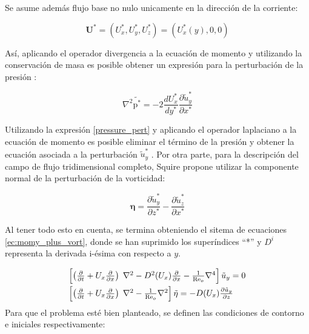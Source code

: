 Se asume además flujo base no nulo unicamente en la dirección de la corriente: 

\begin{equation*}
\mathbf{U^*} = (U^*_x, U^*_y, U^*_z) = (U^*_x(y),0,0)
\end{equation*}

Así, aplicando el operador divergencia a la ecuación de momento y utilizando la conservación de masa es posible obtener un expresión para la perturbación de la presión \cite{schmid}:

\begin{equation}
\nabla^2 \tilde{\text{p}^*} = -2 \frac{d U^*_x}{d y^*} \frac{\partial \tilde{u}^*_y}{\partial x^*} 
\label{pressure_pert}
\end{equation}

Utilizando la expresión \ref{pressure_pert} y aplicando el operador laplaciano a la ecuación de momento es posible eliminar el término de la presión y obtener la ecuación asociada a la perturbación $\tilde{u}^*_y$ \cite{schmid}. Por otra parte, para la descripción del campo de flujo tridimensional completo, Squire \cite{squire1933} propone utilizar la componente normal de la perturbación de la vorticidad:

\begin{equation*}
\mathbf{\eta} = \frac{\partial \tilde{u}^*_y}{\partial z^*} - \frac{\partial \tilde{u}^*_z}{\partial x^*}
\end{equation*}

Al tener todo esto en cuenta, se termina obteniendo el sitema de ecuaciones \ref{ec:momy_plus_vort}, donde se han suprimido los superíndices ``*'' y $D^i$ representa la derivada i-ésima con respecto a $y$. 


\begin{equation}
\begin{array}{l}
    \left[ \left( \frac{\partial}{\partial t} + U_x \frac{\partial}{\partial x} \right) \hspace{1mm} \nabla^2 - D^2 (U_x) \frac{\partial}{\partial x} - \frac{1}{\text{Re}_o} \nabla^4 \right] \tilde{u}_y = 0 \vspace*{1mm}\\
    \left[ \left( \frac{\partial}{\partial t} + U_x \frac{\partial}{\partial x} \right) \hspace{1mm} \nabla^2 - \frac{1}{\text{Re}_o} \nabla^2 \right] \tilde{\eta} = - D(U_x) \frac{\partial \tilde{u}_y}{\partial z}
\end{array}
\label{ec:momy_plus_vort}
\end{equation} 
Para que el problema esté bien planteado, se definen las condiciones de contorno e iniciales
respectivamente:

